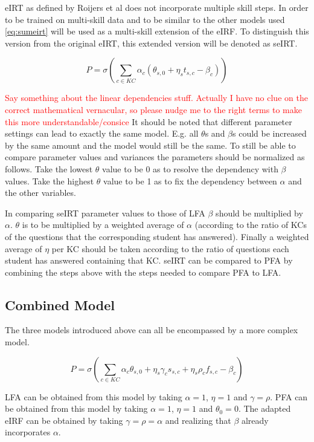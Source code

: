 \documentclass{article}
\newcommand\todo[1]{\textcolor{red}{#1}}
\begin{document}
eIRT as defined by Roijers et al does not incorporate multiple skill steps. In order to be trained on multi-skill data and to be similar to the other models used \ref{eq:sumeirt} will be used as a multi-skill extension of the eIRF. To distinguish this version from the original eIRT, this extended version will be denoted as seIRT.

\begin{equation}
\label{eq:sumeirt}
P = \sigma(\sum_{c \in KC} \alpha_{c}(\theta_{s,0} + \eta_{s} t_{s,c} - \beta_{c}))
\end{equation}

\todo{Say something about the linear dependencies stuff. Actually I have no clue on the correct mathematical vernacular, so please nudge me to the right terms to make this more understandable/consice}
It should be noted that different parameter settings can lead to exactly the same model. E.g. all $\theta$s and $\beta$s could be increased by the same amount and the model would still be the same. To still be able to compare parameter values and variances the parameters should be normalized as follows. Take the lowest $\theta$ value to be 0 as to resolve the dependency with $\beta$ values. Take the highest $\theta$ value to be 1 as to fix the dependency between $\alpha$ and the other variables.

In comparing seIRT parameter values to those of LFA $\beta$ should be multiplied by $\alpha$. $\theta$ is to be multiplied by a weighted average of $\alpha$ (according to the ratio of KCs of the questions that the corresponding student has answered). Finally a weighted average of $\eta$ per KC should be taken according to the ratio of questions each student has answered containing that KC. seIRT can be compared to PFA by combining the steps above with the steps needed to compare PFA to LFA.

\subsection{Combined Model}
The three models introduced above can all be encompassed by a more complex model.

\begin{equation}
P = \sigma(\sum_{c \in KC} \alpha_c \theta_{s,0}+\eta_{s} \gamma_{c} s_{s,c} + \eta_{s}\rho_{c} f_{s,c} - \beta_{c})
\end{equation}

LFA can be obtained from this model by taking $\alpha=1$, $\eta=1$ and $\gamma=\rho$. PFA can be obtained from this model by taking $\alpha=1$, $\eta=1$ and $\theta_{0}=0$. The adapted eIRF can be obtained by taking $\gamma=\rho=\alpha$ and realizing that $\beta$ already incorporates $\alpha$.
\end{document}
